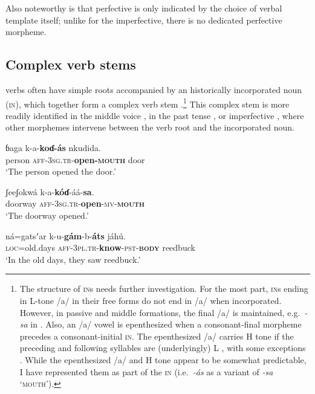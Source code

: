 \documentclass[output=paper]{langsci/langscibook}
\begin{document}
Also noteworthy is that perfective is only indicated by the choice of verbal template itself; unlike for the imperfective, there is no dedicated perfective morpheme.

\subsection{Complex verb stems}\label{sec:ahlandc:4.1}

 verbs often have simple roots accompanied by an historically incorporated noun (\textsc{in}), which together form a complex verb stem .\footnote{The structure of \textsc{in}s needs further investigation. For the most part, \textsc{in}s ending in L-tone /a/ in their free forms do not end in /a/ when incorporated. However, in passive and middle formations, the final /a/ is maintained, e.g.\ \textit{{}-sa} in . Also, an /a/ vowel is epenthesized when a consonant-final morpheme precedes a consonant-initial \textsc{in}. The epenthesized /a/ carries H tone if the preceding and following syllables are (underlyingly) L , with some exceptions . While the epenthesized /a/ and H tone appear to be somewhat predictable, I have represented them as part of the \textsc{in} (i.e.\ \textit{{}-ás} as a variant of \textit{{}-sa} ‘\textsc{mouth}’). } This complex stem is more readily identified in the middle voice , in the past tense , or imperfective , where other morphemes intervene between the verb root and the incorporated noun.

\ea\label{ex:ahlandc:8}
\gll
ɓaga  k-a-\textbf{koɗ-ás}    nkudida.  \\ 
person  \textsc{aff}{}-\textsc{3sg.tr}{}-\textbf{open-}\textbf{\textsc{mouth}}    door \\
\glt
‘The person opened the door.’ 
\z

\ea\label{ex:ahlandc:9}
\gll 
ʃeeʃokwá   k-a-\textbf{k\'{o}ɗ}{}-áá-\textbf{sa}. \\
doorway   \textsc{aff-3sg.tr}{}-\textbf{open}{}-\textsc{mv-}\textbf{\textsc{mouth}} \\
\glt
‘The doorway opened.’
\z

\ea\label{ex:ahlandc:10}
\gll 
ná=gatsʼar  k-u-\textbf{gám}{}-b-\textbf{áts}                             jáhú. \\
\textsc{loc}=old.days  \textsc{aff}\textsc{{}-3pl.tr}{}-\textbf{know}{}-\textsc{pst-}\textbf{\textsc{body}}    reedbuck \\
\glt
‘In the old days, they saw reedbuck.’
\z
\end{document}
